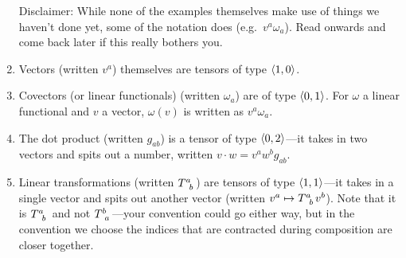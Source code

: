 \begin{exm}
\begin{enumerate}
Disclaimer:  While none of the examples themselves make use of things we haven't done yet, some of the notation does (e.g.~$v^a\omega _a$).  Read onwards and come back later if this really bothers you.
\item Vectors (written $v^a$) themselves are tensors of type $\langle1,0\rangle$.
\item Covectors (or linear functionals) (written $\omega _a$) are of type $\langle0,1\rangle$.  For $\omega$ a linear functional and $v$ a vector, $\omega (v)$ is written as $v^a\omega _a$.
\item The dot product (written $g_{ab}$) is a tensor of type $\langle0,2\rangle$---it takes in two vectors and spits out a number, written $v\cdot w=v^aw^bg_{ab}$.
\item Linear transformations (written $T\indices{^a_b}$) are tensors of type $\langle1,1\rangle$---it takes in a single vector and spits out another vector (written $v^a\mapsto T\indices{^a_b}v^b$).  Note that it is $T\indices{^a_b}$ and not $T\indices{^b_a}$---your convention could go either way, but in the convention we choose the indices that are contracted during composition are closer together.
\end{enumerate}
\end{exm}

